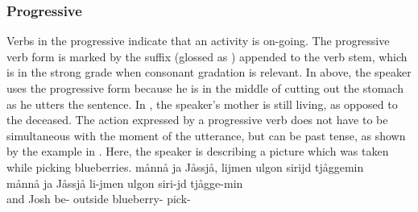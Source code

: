 \subsubsection{Progressive}\label{progressiveAspect}
Verbs in the progressive indicate that an activity is on-going. The progressive verb form is marked by the suffix  (glossed as \PROGs) appended to the verb stem, which is in the strong grade when consonant gradation is relevant. %
In  above, the speaker uses the progressive form  because he is in the middle of cutting out the stomach as he utters the sentence. In , the speaker’s mother is still living, as opposed to the deceased. 
The action expressed by a progressive verb does not have to be simultaneous with the moment of the utterance, but can be past tense, as shown by the %
example in . %
Here, the speaker is describing a picture which was taken while picking blueberries. 
\ea\label{inflectionalCatsVerbsEx2b}%
\glll	månnå ja Jåssjå, lijmen ulgon sirijd tjåggemin\\
	månnå ja Jåssjå li-jmen ulgon siri-jd tjågge-min\\
	 and Josh\BS{} be- outside blueberry- pick-\\\nopagebreak
{}	
\z


